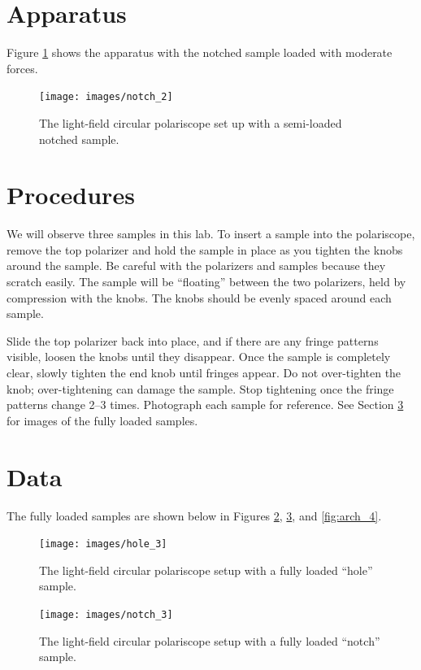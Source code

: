 \documentclass[12 pt]{article}
\begin{document}
\section{Apparatus} \label{apparatus}
Figure \ref{fig:notch_2} shows the apparatus with the notched sample loaded with moderate forces.

\begin{figure}[htbp]
\centering
\texttt{[image: images/notch\_2]}
\caption{The light-field circular polariscope set up with a semi-loaded notched sample.}
\label{fig:notch_2}
\end{figure}

\section{Procedures} \label{procedures}
We will observe three samples in this lab. To insert a sample into the polariscope, remove the top polarizer and hold the sample in place as you tighten the knobs around the sample. Be careful with the polarizers and samples because they scratch easily. The sample will be ``floating'' between the two polarizers, held by compression with the knobs. The knobs should be evenly spaced around each sample.

Slide the top polarizer back into place, and if there are any fringe patterns visible, loosen the knobs until they disappear. Once the sample is completely clear, slowly tighten the end knob until fringes appear. Do not over-tighten the knob; over-tightening can damage the sample. Stop tightening once the fringe patterns change 2--3 times. Photograph each sample for reference. See Section \ref{data} for images of the fully loaded samples.

\section{Data} \label{data}
The fully loaded samples are shown below in Figures \ref{fig:hole_3}, \ref{fig:notch_3}, and \ref{fig:arch_4}.

\begin{figure}[htbp]
\centering
\texttt{[image: images/hole\_3]}
\caption{The light-field circular polariscope setup with a fully loaded ``hole'' sample.}
\label{fig:hole_3}
\end{figure}

\begin{figure}[htbp]
\centering
\texttt{[image: images/notch\_3]}
\caption{The light-field circular polariscope setup with a fully loaded ``notch'' sample.}
\label{fig:notch_3}
\end{figure}
\end{document}

